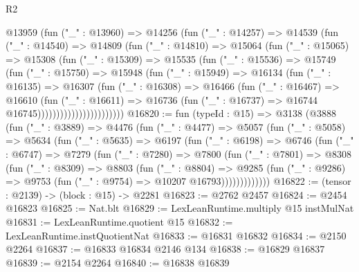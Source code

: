 \begin{lexlean}{R2}
\begin{coremodule}
                    @13959
                      (fun ("_" : @13960) =>
                      @14256
                        (fun ("_" : @14257) =>
                        @14539
                          (fun ("_" : @14540) =>
                          @14809
                            (fun ("_" : @14810) =>
                            @15064
                              (fun ("_" : @15065) =>
                              @15308
                                (fun ("_" : @15309) =>
                                @15535
                                  (fun ("_" : @15536) =>
                                  @15749
                                    (fun ("_" : @15750) =>
                                    @15948
                                      (fun ("_" : @15949) =>
                                      @16134
                                        (fun ("_" : @16135) =>
                                        @16307
                                          (fun ("_" : @16308) =>
                                          @16466
                                            (fun ("_" : @16467) =>
                                            @16610
                                              (fun ("_" : @16611) =>
                                              @16736
                                                (fun ("_" : @16737) =>
                                                @16744 @16745)))))))))))))))))))))))
@16820 := fun (typeId : @15) =>
  @3138
    (@3888
      (fun ("_" : @3889) =>
      @4476
        (fun ("_" : @4477) =>
        @5057
          (fun ("_" : @5058) =>
          @5634
            (fun ("_" : @5635) =>
            @6197
              (fun ("_" : @6198) =>
              @6746
                (fun ("_" : @6747) =>
                @7279
                  (fun ("_" : @7280) =>
                  @7800
                    (fun ("_" : @7801) =>
                    @8308
                      (fun ("_" : @8309) =>
                      @8803
                        (fun ("_" : @8804) =>
                        @9285
                          (fun ("_" : @9286) =>
                          @9753 (fun ("_" : @9754) => @10207 @16793)))))))))))))
@16822 := (tensor : @2139) -> (block : @15) -> @2281
@16823 := @2762 @2457
@16824 := @2454 @16823
@16825 := Nat.blt
@16829 := LexLeanRuntime.multiply @15 instMulNat
@16831 := LexLeanRuntime.quotient @15
@16832 := LexLeanRuntime.instQuotientNat
@16833 := @16831 @16832
@16834 := @2150 @2264
@16837 := @16833 @16834 @2146 @134
@16838 := @16829 @16837
@16839 := @2154 @2264
@16840 := @16838 @16839

\end{coremodule}
\end{lexlean}
